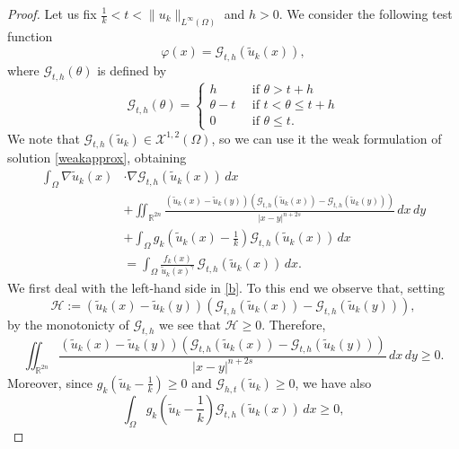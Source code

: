 \documentclass[10pt,a4paper]{amsart}
\def \R {\mathbb{R}}
\def \XX {\mathcal{X}}
\begin{document}
\begin{proof}
Let us fix $\frac{1}{k}< t<\|u_k\|_{L^\infty(\Omega)}$ and $h>0$. We consider the following test function 
$$\varphi(x)=\mathcal{G}_{t,h}(\tilde u_k(x)),$$ 
where $\mathcal{G}_{t,h}(\theta)$ is defined by
\begin{equation}\label{def-G}
\mathcal{G}_{t,h}(\theta)=\begin{cases}
h \qquad & \mbox{if } \theta>t+h\\
\theta-t & \mbox{if } t<\theta\leq t+h\\
0  & \mbox{if } \theta\leq t.
\end{cases}
\end{equation}
We note that $\mathcal{G}_{t,h}(\tilde u_k)\in \XX^{1,2}(\Omega)$, so we can use it the weak formulation of solution \eqref{weakapprox}, obtaining
\begin{equation}\label{b}
\begin{aligned}
\int_{\Omega}\nabla \tilde u_k(x)&\cdot\nabla\mathcal{G}_{t,h}(\tilde u_k(x))\,dx\\
&+\iint_{\R^{2n}}\frac{(\tilde u_k(x)-\tilde u_k(y))\left(\mathcal{G}_{t,h}(\tilde u_k(x))-\mathcal{G}_{t,h}(\tilde u_k(y))\right)}{|x-y|^{n+2s}}\,dx\,dy\\
&+\int_\Omega
g_k\left(\tilde u_k(x)-\frac 1 k \right)\mathcal{G}_{t,h}(\tilde u_k(x))\,dx\\
&=\int_{\Omega}\frac{f_k(x)}{\tilde u_k(x)^{\gamma}}\,\mathcal{G}_{t,h}(\tilde u_k(x))\,dx.
\end{aligned}
\end{equation}
We first deal with the left-hand side in \eqref{b}. To this end we observe that, setting\begin{equation*}
\mathcal{H}:= (\tilde u_k(x)-\tilde u_k(y))\left(\mathcal{G}_{t,h}(\tilde u_k(x))-\mathcal{G}_{t,h}(\tilde u_k(y))\right),
\end{equation*}
by the monotonicty of $\mathcal{G}_{t,h}$ we see that
$\mathcal{H}\geq 0$.
Therefore, 
\begin{equation*}
 \iint_{\R^{2n}}\frac{(\tilde u_k(x)-\tilde u_k(y))\left(\mathcal{G}_{t,h}(\tilde u_k(x))-\mathcal{G}_{t,h}(\tilde u_k(y))\right)}{|x-y|^{n+2s}}\,dx\,dy\geq 0.
\end{equation*}
Moreover, since $g_k\left(\tilde u_k-\frac{1}{k}\right)\geq 0$ and $\mathcal{G}_{h,t}(\tilde u_k)\geq 0$, we have also
\begin{equation*}
    \int_\Omega g_k\left(\tilde u_k-\frac{1}{k}\right)\mathcal{G}_{t,h}(\tilde u_k(x))\,dx\geq 0,
\end{equation*}

\end{proof}
\end{document}
